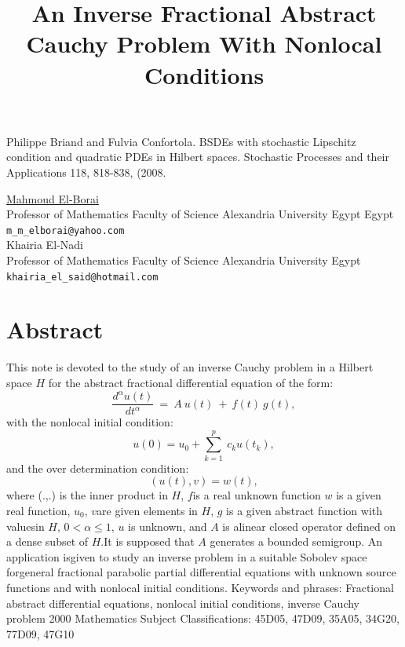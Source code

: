 \documentclass[article,A4,11pt]{llncs}%
\begin{document}

\begin{thebibliography}{10}
{\sc Philippe Briand and Fulvia Confortola}. {BSDEs with stochastic Lipschitz condition and quadratic PDEs in Hilbert spaces}. Stochastic Processes and their Applications 118, 818-838, (2008.
\end{thebibliography}

\title{An Inverse Fractional Abstract Cauchy Problem With Nonlocal Conditions}
 \author{} \institute{}
\maketitle
\begin{center}
{\large \underline{Mahmoud El-Borai}}\\
Professor of Mathematics Faculty of Science Alexandria University Egypt Egypt\\
{\tt \tt m\_m\_elborai@yahoo.com}
\\ \vspace{4mm}
{\large Khairia El-Nadi}\\
Professor of Mathematics Faculty of Science Alexandria University  Egypt\\
{\tt \tt khairia\_el\_said@hotmail.com}
\end{center}

\section*{Abstract}



This note is devoted to the study of an inverse Cauchy problem in a Hilbert space $H$ for the abstract fractional differential equation of the form:  $$\frac{d^{\alpha}u(t)}{dt^\alpha}~=~A~u(t)~+~f(t)~g(t),$$with the nonlocal initial condition:$$u(0) = u_0 + \sum_{k=1}^p~c_k u(t_k),$$and the over determination condition:$$(u(t), v) = w (t),$$where (.,.) is the inner product in $H$, $f$is a real unknown function $w$ is a given real function, $u_0$, $v$are given elements in $H$, $g$ is a given abstract function with valuesin $H$, $0 < \alpha \leq 1 $, $u$ is unknown, and $A$ is alinear closed operator defined on a dense subset of $H$.It is supposed that $A$ generates a bounded semigroup. An application isgiven to study an inverse problem in a suitable Sobolev space forgeneral fractional parabolic partial differential equations with  unknown source functions and with nonlocal initial conditions.
Keywords and phrases: Fractional abstract differential equations, nonlocal initial conditions, inverse Cauchy problem 
2000 Mathematics Subject Classifications: 45D05, 47D09, 35A05, 34G20, 77D09, 47G10
\end{document}

